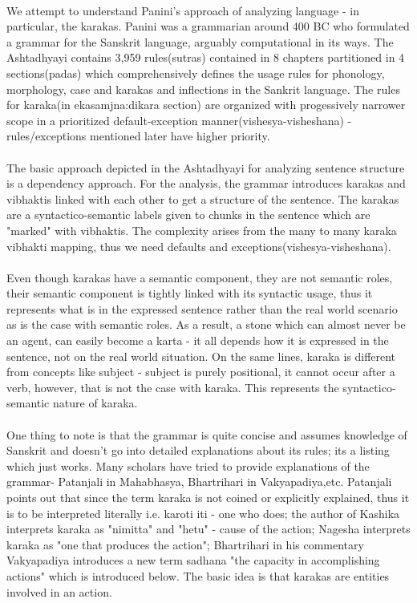 \documentclass[a4paper,10pt]{article}
\begin{document}
\paragraph{}
\color{black!60}
We attempt to understand Panini's approach of analyzing language - in particular, the karakas. Panini was a grammarian around 400 BC who formulated a grammar for the Sanskrit language, arguably computational in its ways. The Ashtadhyayi contains 3,959 rules(sutras) contained in 8 chapters partitioned in 4 sections(padas) which comprehensively defines the usage rules for phonology, morphology, case and karakas and inflections in the Sankrit language. The rules for karaka(in ekasamjna:dikara section) are organized with progessively narrower scope in a prioritized default-exception manner(vishesya-visheshana) - rules/exceptions mentioned later have higher priority.
\paragraph{} The basic approach depicted in the Ashtadhyayi for analyzing sentence structure is a dependency approach. For the analysis, the grammar introduces karakas and vibhaktis linked with each other to get a structure of the sentence. The karakas are a syntactico-semantic labels given to chunks in the sentence which are "marked" with vibhaktis. The complexity arises from the many to many karaka vibhakti mapping, thus we need defaults and exceptions(vishesya-visheshana).
\paragraph{} Even though karakas have a semantic component, they are not semantic roles, their semantic component is tightly linked with its syntactic usage, thus it represents what is in the expressed sentence rather than the real world scenario as is the case with semantic roles. As a result, a stone which can almost never be an agent, can easily become a karta - it all depends how it is expressed in the sentence, not on the real world situation. On the same lines, karaka is different from concepts like subject - subject is purely positional, it cannot occur after a verb, however, that is not the case with karaka. This represents the syntactico-semantic nature of karaka.
\paragraph{} One thing to note is that the grammar is quite concise and assumes knowledge of Sanskrit and doesn't go into detailed explanations about its rules; its a listing which just works. Many scholars have tried to provide explanations of the grammar- Patanjali in Mahabhasya, Bhartrihari in Vakyapadiya,etc. Patanjali points out that since the term karaka is not coined or explicitly explained, thus it is to be interpreted literally i.e. karoti iti - one who does; the author of Kashika interprets karaka as "nimitta" and "hetu" - cause of the action; Nagesha interprets karaka as "one that produces the action"; Bhartrihari in his commentary Vakyapadiya introduces a new term sadhana "the capacity in accomplishing actions" which is introduced below. The basic idea is that karakas are entities involved in an action.
\end{document}
